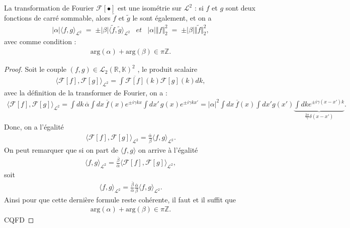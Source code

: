 \begin{Theo} 
    La transformation de Fourier $\mathcal F [\bullet]$ est une isométrie sur $\mathcal L^2$ : si $f$ et $g$ sont deux fonctions de carré sommable, alors $\tilde f$ et $\tilde g$ le sont également, et on a 
    \begin{eqnarray}
        \vert \alpha \vert \langle f , g \rangle_{\mathcal L^2} \; = \; \pm \vert \beta \vert    \langle \tilde f , \tilde g \rangle_{\mathcal L^2} & et &\vert \alpha \vert  \Vert f \Vert_2^2 \; = \; \pm  \vert \beta \vert \Vert \tilde f \Vert_2^2,
    \end{eqnarray}
    avec comme condition :
    \begin{eqnarray}
        \mathrm{arg}(\alpha) + \mathrm{arg}(\beta)  \in \pi \mathbb Z .
    \end{eqnarray}
\end{Theo}
\begin{proof}
Soit le couple $(f, g) \in \mathcal{L}_2(\mathbb{R}, \mathbb{K})^2$ , le produit scalaire 
\begin{eqnarray}
    \langle \mathcal{F}[f] , \mathcal{F}[g]\rangle_{\mathcal L^2 } =  \int \overline{\mathcal{F}[f]}(k) \mathcal{F}[g](k) dk ,
\end{eqnarray}
avec la définition de la transformer de Fourier, on a : 
\begin{eqnarray}
    \langle \mathcal{F}[f] , \mathcal{F}[g] \rangle_{\mathcal L^2 } =  \int dk \, \overline \alpha \int dx \,  \overline f(x) e^{\pm i \gamma k x }   \int dx' \, g(x) e^{\pm i \gamma   k x' }  = \vert \alpha \vert ^2 \int dx \, \overline f(x) \!\int dx' g(x') \underbrace{\int dk e^{\pm i \gamma  ( x - x') k }}_{\frac{2\pi}{\gamma } \delta ( x - x')}.
\end{eqnarray}
Donc, on a l'égalité
\begin{eqnarray}
    \langle \mathcal{F}[f] , \mathcal{F}[g]\rangle_{\mathcal L^2 } =  \frac{\overline \alpha}\beta \langle  f , g\rangle_{\mathcal L^2 }.
\end{eqnarray} 
On peut remarquer que si on part de $\langle f , g \rangle$ on arrive à l'égalité 
\begin{eqnarray}
    \langle f , g \rangle_{\mathcal L^2 }  = \frac{\overline \beta}{\alpha} \langle \mathcal{F}[f] , \mathcal{F}[g] \rangle_{\mathcal L^2 },
\end{eqnarray}
 soit
\begin{eqnarray}
 \langle f , g \rangle_{\mathcal L^2 }  = \frac{\overline \beta}{\alpha} \frac{\overline \alpha}\beta \langle f , g \rangle_{\mathcal L^2 } .
\end{eqnarray}
Ainsi pour que cette dernière formule reste cohérente, il faut et il suffit que 
\begin{eqnarray}
    \mathrm{arg}(\alpha) + \mathrm{arg}(\beta)  \in \pi \mathbb Z .
\end{eqnarray}
CQFD
\end{proof}

